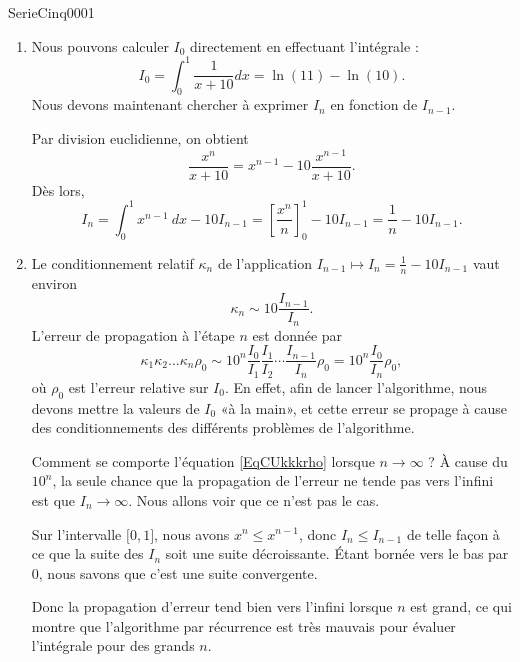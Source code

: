 
\begin{corrige}{SerieCinq0001}


	\begin{enumerate}

		\item
			Nous pouvons calculer $I_0$ directement en effectuant l'intégrale :
			\begin{equation}
				I_0=\int_0^1\frac{1}{ x+10 }dx=\ln(11)-\ln(10).
			\end{equation}
			Nous devons maintenant chercher à exprimer $I_n$ en fonction de $I_{n-1}$.

			Par division euclidienne, on obtient
			\[
				\frac{x^n}{x+10} = x^{n-1} - 10 \frac{x^{n-1}}{x+10}.
			\]
			D\`es lors,
			\[
				I_n = \int_0^1 x^{n-1} \: dx - 10 I_{n-1} = \left[ \frac{x^n}{n} \right]_0^1 - 10 I_{n-1} = \frac{1}{n} - 10 I_{n-1}.
			\]
		 \item
			 Le conditionnement relatif $\kappa_n$ de l'application $I_{n-1} \mapsto I_n = \frac{1}{n} - 10 I_{n-1}$ vaut environ
			\[
				\kappa_n \sim 10 \frac{I_{n-1}}{I_n}.
			\]
			L'erreur de propagation à l'étape $n$ est donnée par 
			\begin{equation}	\label{EqCUkkkrho}
				\kappa_1 \kappa_2 \dots \kappa_n \rho_0 \sim  10^n\frac{ I_0 }{ I_1 }\frac{ I_1 }{ I_2 }\cdots\frac{ I_{n-1} }{ I_n }\rho_0=10^n \frac{I_0}{I_n} \rho_0,
			\end{equation}
			où $\rho_0$ est l'erreur relative sur $I_0$. En effet, afin de lancer l'algorithme, nous devons mettre la valeurs de $I_0$ «à la main», et cette erreur se propage à cause des conditionnements des différents problèmes de l'algorithme.

			Comment se comporte l'équation \eqref{EqCUkkkrho} lorsque $n\to\infty$ ? À cause du $10^n$, la seule chance que la propagation de l'erreur ne tende pas vers l'infini est que $I_n\to\infty$. Nous allons voir que ce n'est pas le cas.

			Sur l'intervalle $\mathopen[ 0 , 1 \mathclose]$, nous avons $x^n\leq x^{n-1}$, donc $I_{n}\leq I_{n-1}$ de telle façon à ce que la suite des $I_n$ soit une suite décroissante. Étant bornée vers le bas par $0$, nous savons que c'est une suite convergente.

			Donc la propagation d'erreur tend bien vers l'infini lorsque $n$ est grand, ce qui montre que l'algorithme par récurrence est très mauvais pour évaluer l'intégrale pour des grands $n$.

	\end{enumerate}
\end{corrige}
